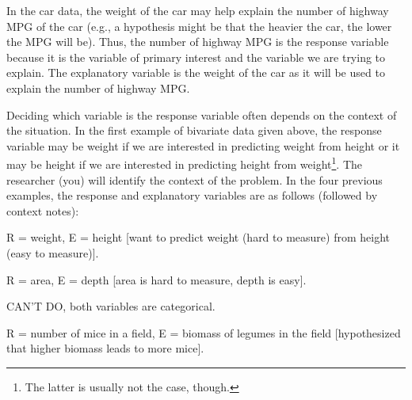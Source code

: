 \documentclass[10pt,openany]{book}\usepackage[]{graphicx}\usepackage[]{color}
\begin{document}

\vspace{-12pt}

\vspace{-12pt}

In the car data, the weight of the car may help explain the number of highway MPG of the car (e.g., a hypothesis might be that the heavier the car, the lower the MPG will be).  Thus, the number of highway MPG is the response variable because it is the variable of primary interest and the variable we are trying to explain.  The explanatory variable is the weight of the car as it will be used to explain the number of highway MPG.

Deciding which variable is the response variable often depends on the context of the situation.  In the first example of bivariate data given above, the response variable may be weight if we are interested in predicting weight from height or it may be height if we are interested in predicting height from weight\footnote{The latter is usually not the case, though.}.  The researcher (you) will identify the context of the problem.  In the four previous examples, the response and explanatory variables are as follows (followed by context notes):
\begin{Itemize}
  \item R = weight, E = height [want to predict weight (hard to measure) from height (easy to measure)].
  \item R = area, E = depth [area is hard to measure, depth is easy].
  \item CAN'T DO, both variables are categorical.
  \item R = number of mice in a field, E = biomass of legumes in the field [hypothesized that higher biomass leads to more mice].
\end{Itemize}

\end{document}
